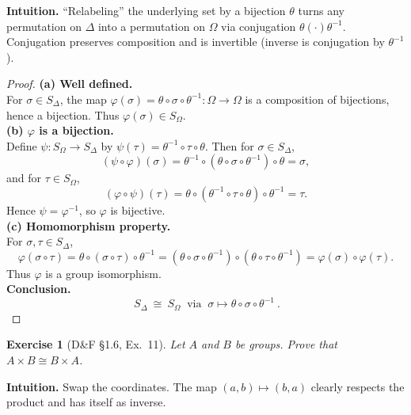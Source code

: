 \documentclass[12pt]{article}
\newtheorem{exercise}[theorem]{Exercise}
\theoremstyle{definition}
\begin{document}
\dotfill

\noindent\textbf{Intuition.}
“Relabeling” the underlying set by a bijection $\theta$ turns any permutation on $\Delta$ into a permutation on $\Omega$ via conjugation $\theta(\cdot)\theta^{-1}$. Conjugation preserves composition and is invertible (inverse is conjugation by $\theta^{-1}$).\\

\dotfill

\begin{proof}
\noindent\textbf{(a) Well defined.}\\
\noindent For $\sigma\in S_\Delta$, the map $\varphi(\sigma)=\theta\circ\sigma\circ\theta^{-1}:\Omega\to\Omega$ is a composition of bijections, hence a bijection. Thus $\varphi(\sigma)\in S_\Omega$.\\

\noindent\textbf{(b) $\varphi$ is a bijection.}\\
\noindent Define $\psi:S_\Omega\to S_\Delta$ by $\psi(\tau)=\theta^{-1}\circ\tau\circ\theta$. Then for $\sigma\in S_\Delta$,
\[
(\psi\circ\varphi)(\sigma)=\theta^{-1}\circ(\theta\circ\sigma\circ\theta^{-1})\circ\theta=\sigma,
\]
and for $\tau\in S_\Omega$,
\[
(\varphi\circ\psi)(\tau)=\theta\circ(\theta^{-1}\circ\tau\circ\theta)\circ\theta^{-1}=\tau.
\]
Hence $\psi=\varphi^{-1}$, so $\varphi$ is bijective.\\

\noindent\textbf{(c) Homomorphism property.}\\
\noindent For $\sigma,\tau\in S_\Delta$,
\[
\varphi(\sigma\circ\tau)
=\theta\circ(\sigma\circ\tau)\circ\theta^{-1}
=(\theta\circ\sigma\circ\theta^{-1})\circ(\theta\circ\tau\circ\theta^{-1})
=\varphi(\sigma)\circ\varphi(\tau).
\]
Thus $\varphi$ is a group isomorphism.\\

\noindent\textbf{Conclusion.}
\[
\boxed{\ S_\Delta\ \cong\ S_\Omega\ \text{ via }\ \sigma\mapsto \theta\circ\sigma\circ\theta^{-1}\ }.
\]
\end{proof}

\newpage

\begin{exercise}[D\&F §1.6, Ex.~11]
Let $A$ and $B$ be groups. Prove that $A\times B \cong B\times A$.
\end{exercise}

\dotfill

\noindent\textbf{Intuition.}
Swap the coordinates. The map $(a,b)\mapsto(b,a)$ clearly respects the product and has itself as inverse.\\
\end{document}
